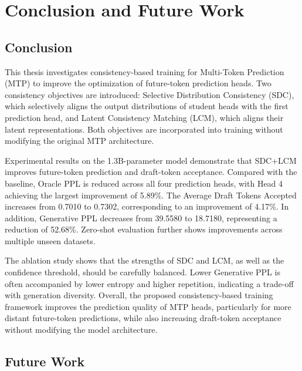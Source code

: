 
\chapter{Conclusion and Future Work}\label{chap:conclusion_future_work}

\section{Conclusion}\label{sec:conclusion}

This thesis investigates consistency-based training for Multi-Token
Prediction (MTP) to improve the optimization of future-token prediction
heads. Two consistency objectives are introduced: Selective Distribution
Consistency (SDC), which selectively aligns the output distributions of
student heads with the first prediction head, and Latent Consistency
Matching (LCM), which aligns their latent representations. Both objectives
are incorporated into training without modifying the original MTP
architecture.

Experimental results on the 1.3B-parameter model demonstrate that SDC+LCM
improves future-token prediction and draft-token acceptance. Compared with
the baseline, Oracle PPL is reduced across all four prediction heads, with
Head 4 achieving the largest improvement of 5.89\%. The Average Draft Tokens
Accepted increases from 0.7010 to 0.7302, corresponding to an improvement
of 4.17\%. In addition, Generative PPL decreases from 39.5580 to 18.7180,
representing a reduction of 52.68\%. Zero-shot evaluation further shows
improvements across multiple unseen datasets.

The ablation study shows that the strengths of SDC and LCM, as well as the
confidence threshold, should be carefully balanced. Lower Generative PPL is
often accompanied by lower entropy and higher repetition, indicating a
trade-off with generation diversity. Overall, the proposed consistency-based
training framework improves the prediction quality of MTP heads, particularly
for more distant future-token predictions, while also increasing
draft-token acceptance without modifying the model architecture.

\section{Future Work}\label{sec:future_work}

